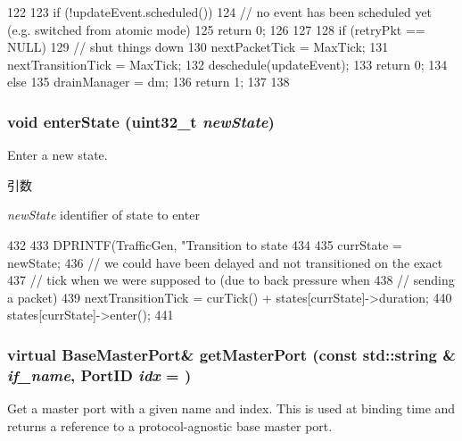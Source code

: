 \begin{DoxyCode}
122 {
123     if (!updateEvent.scheduled()) {
124         // no event has been scheduled yet (e.g. switched from atomic mode)
125         return 0;
126     }
127 
128     if (retryPkt == NULL) {
129         // shut things down
130         nextPacketTick = MaxTick;
131         nextTransitionTick = MaxTick;
132         deschedule(updateEvent);
133         return 0;
134     } else {
135         drainManager = dm;
136         return 1;
137     }
138 }
\end{DoxyCode}
\hypertarget{classTrafficGen_a1346cf8b75d4ba67a861233a8651601d}{
\subsubsection[{enterState}]{\setlength{\rightskip}{0pt plus 5cm}void enterState ({\bf uint32\_\-t} {\em newState})}}
\label{classTrafficGen_a1346cf8b75d4ba67a861233a8651601d}
Enter a new state.


\begin{DoxyParams}{引数}
\item[{\em newState}]identifier of state to enter \end{DoxyParams}



\begin{DoxyCode}
432 {
433     DPRINTF(TrafficGen, "Transition to state %
434 
435     currState = newState;
436     // we could have been delayed and not transitioned on the exact
437     // tick when we were supposed to (due to back pressure when
438     // sending a packet)
439     nextTransitionTick = curTick() + states[currState]->duration;
440     states[currState]->enter();
441 }
\end{DoxyCode}
\hypertarget{classTrafficGen_a54ebb5edc195c159b56a39e6f15b9932}{
\subsubsection[{getMasterPort}]{\setlength{\rightskip}{0pt plus 5cm}virtual {\bf BaseMasterPort}\& getMasterPort (const std::string \& {\em if\_\-name}, \/  {\bf PortID} {\em idx} = {})}}
\label{classTrafficGen_a54ebb5edc195c159b56a39e6f15b9932}
Get a master port with a given name and index. This is used at binding time and returns a reference to a protocol-\/agnostic base master port.


